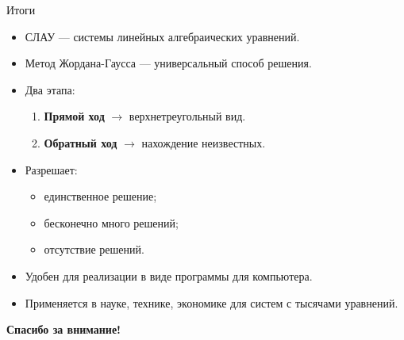 \documentclass[12pt,aspectratio=169]{beamer}
\begin{document}
\begin{frame}{Итоги}
    \begin{itemize}
        \item \alert{СЛАУ} — системы линейных алгебраических уравнений.
        \item \alert{Метод Жордана-Гаусса} — универсальный способ решения.
        \item Два этапа:
        \begin{enumerate}
            \item \textbf{Прямой ход} $\rightarrow$ верхнетреугольный вид.
            \item \textbf{Обратный ход} $\rightarrow$ нахождение неизвестных.
        \end{enumerate}
        \item Разрешает:
        \begin{itemize}
            \item единственное решение;
            \item бесконечно много решений;
            \item отсутствие решений.
        \end{itemize}
        \item Удобен для реализации в виде программы для компьютера.
        \item Применяется в науке, технике, экономике для систем с \alert{тысячами} уравнений.
    \end{itemize}
    \vspace{0.5cm}
    \begin{center}
        \textbf{Спасибо за внимание!}
    \end{center}
\end{frame}
\end{document}
